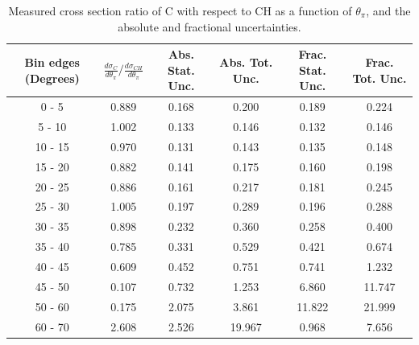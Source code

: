 \documentclass[aps,prl,twocolumn,superscriptaddress,nofootinbib]{revtex4-1}
\begin{document}
\begin{table}[h!]
  \centering
  \caption{Measured cross section ratio of C with respect to CH as a function
  of $\theta_{\pi}$,  and the absolute and fractional uncertainties.}
    \begin{tabular}{c||c||c|c||c|c}
      Bin edges (Degrees) & $\frac{d\sigma_{C}}{d\theta_{\pi}}/\frac{d\sigma_{CH}}{d\theta_{\pi}}$ & Abs. Stat. Unc. & Abs. Tot. Unc. & Frac. Stat. Unc. & Frac. Tot. Unc. \\
      \hline\hline
        0 - 5 & 0.889 & 0.168 & 0.200 & 0.189 & 0.224 \\
       5 - 10 & 1.002 & 0.133 & 0.146 & 0.132 & 0.146 \\
      10 - 15 & 0.970 & 0.131 & 0.143 & 0.135 & 0.148 \\
      15 - 20 & 0.882 & 0.141 & 0.175 & 0.160 & 0.198 \\
      20 - 25 & 0.886 & 0.161 & 0.217 & 0.181 & 0.245 \\
      25 - 30 & 1.005 & 0.197 & 0.289 & 0.196 & 0.288 \\
      30 - 35 & 0.898 & 0.232 & 0.360 & 0.258 & 0.400 \\
      35 - 40 & 0.785 & 0.331 & 0.529 & 0.421 & 0.674 \\
      40 - 45 & 0.609 & 0.452 & 0.751 & 0.741 & 1.232 \\
      45 - 50 & 0.107 & 0.732 & 1.253 & 6.860 & 11.747 \\
      50 - 60 & 0.175 & 2.075 & 3.861 & 11.822 & 21.999 \\
      60 - 70 & 2.608 & 2.526 & 19.967 & 0.968 & 7.656 \\
    \end{tabular}
  \label{table:ThetaPiXSecRatio_C}
\end{table}
\end{document}
